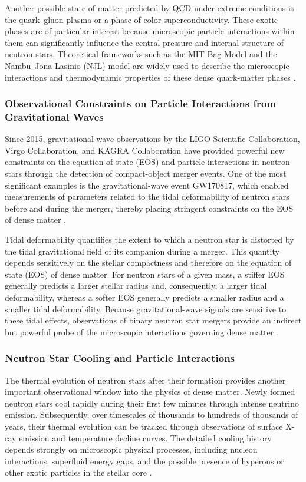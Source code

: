 Another possible state of matter predicted by QCD under extreme conditions is the quark--gluon plasma or a phase of color superconductivity. These exotic phases are of particular interest because microscopic particle interactions within them can significantly influence the central pressure and internal structure of neutron stars. Theoretical frameworks such as the MIT Bag Model and the Nambu--Jona-Lasinio (NJL) model are widely used to describe the microscopic interactions and thermodynamic properties of these dense quark-matter phases \cite{alford2008,fukushima2011}.

\subsubsection{Observational Constraints on Particle Interactions from Gravitational Waves}

Since 2015, gravitational-wave observations by the LIGO Scientific Collaboration, Virgo Collaboration, and KAGRA Collaboration have provided powerful new constraints on the equation of state (EOS) and particle interactions in neutron stars through the detection of compact-object merger events. One of the most significant examples is the gravitational-wave event GW170817, which enabled measurements of parameters related to the tidal deformability of neutron stars before and during the merger, thereby placing stringent constraints on the EOS of dense matter \cite{abbott2017,tews2018}.

Tidal deformability quantifies the extent to which a neutron star is distorted by the tidal gravitational field of its companion during a merger. This quantity depends sensitively on the stellar compactness and therefore on the equation of state (EOS) of dense matter. For neutron stars of a given mass, a stiffer EOS generally predicts a larger stellar radius and, consequently, a larger tidal deformability, whereas a softer EOS generally predicts a smaller radius and a smaller tidal deformability. Because gravitational-wave signals are sensitive to these tidal effects, observations of binary neutron star mergers provide an indirect but powerful probe of the microscopic interactions governing dense matter \cite{chatziioannou2020}.

\subsubsection{Neutron Star Cooling and Particle Interactions}

The thermal evolution of neutron stars after their formation provides another important observational window into the physics of dense matter. Newly formed neutron stars cool rapidly during their first few minutes through intense neutrino emission. Subsequently, over timescales of thousands to hundreds of thousands of years, their thermal evolution can be tracked through observations of surface X-ray emission and temperature decline curves. The detailed cooling history depends strongly on microscopic physical processes, including nucleon interactions, superfluid energy gaps, and the possible presence of hyperons or other exotic particles in the stellar core \cite{page2006,yakovlev2004}.

